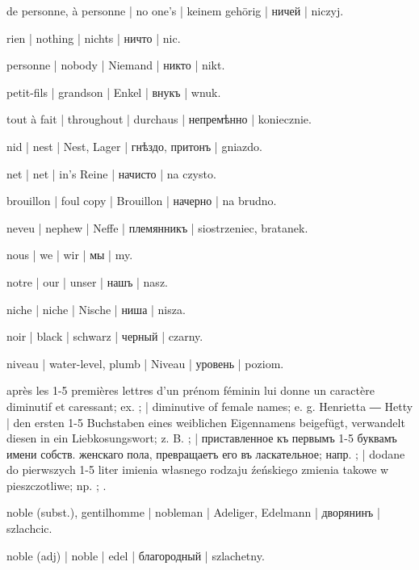 \begin{outdent}{1em}
de personne, à personne | no one’s | keinem gehörig | ничей | niczyj.

rien | nothing | nichts | ничто | nic.

personne | nobody | Niemand | никто | nikt.

petit-fils | grandson | Enkel | внукъ | wnuk.

tout à fait | throughout | durchaus | непремѣнно | koniecznie.

nid | nest | Nest, Lager | гнѣздо, притонъ | gniazdo.

net | net | in’s Reine | начисто | na czysto.

\uvsubentry{}
brouillon | foul copy | Brouillon | начерно | na brudno.

neveu | nephew | Neffe | племянникъ | siostrzeniec, bratanek.

nous | we | wir | мы | my.

\uvsubentry{}
notre | our | unser | нашъ | nasz.

niche | niche | Nische | ниша | nisza.

noir | black | schwarz | черный | czarny.

niveau | water-level, plumb | Niveau | уровень | poziom.

après les 1-5 premières lettres d’un prénom féminin lui donne un
caractère diminutif et caressant; ex. ; 
| diminutive of female names; e. g.  Henrietta
―  Hetty | den ersten 1-5 Buchstaben eines
weiblichen Eigennamens beigefügt, verwandelt diesen in ein
Liebkosungswort; z. B. ; 
| приставленное къ первымъ 1-5 буквамъ имени собств. женскаго пола,
превращаетъ его въ ласкательное; напр. ; 
| dodane do pierwszych 1-5 liter imienia własnego rodzaju
źeńskiego zmienia takowe w pieszczotliwe; np. ;
.

noble (subst.), gentilhomme | nobleman | Adeliger, Edelmann | дворянинъ | szlachcic.

noble (adj) | noble | edel | благородный | szlachetny.


\end{outdent}
